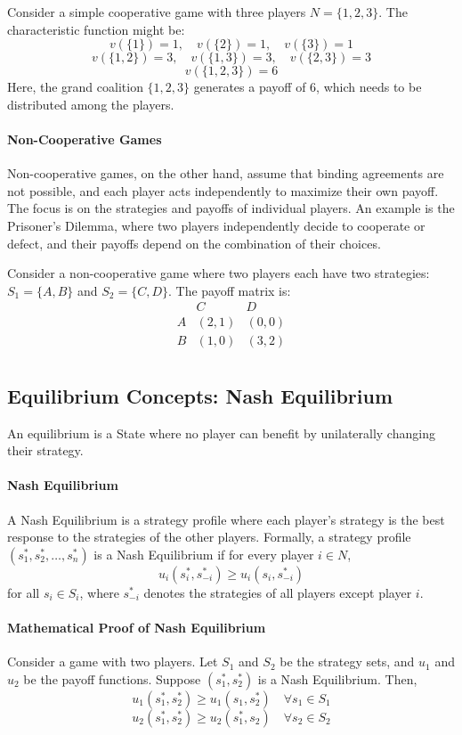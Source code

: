 \documentclass[12pt]{book} %
\begin{document}
Consider a simple cooperative game with three players \( N = \{1, 2, 3\} \). The characteristic function might be:
\[
v(\{1\}) = 1, \quad v(\{2\}) = 1, \quad v(\{3\}) = 1
\]
\[
v(\{1, 2\}) = 3, \quad v(\{1, 3\}) = 3, \quad v(\{2, 3\}) = 3
\]
\[
v(\{1, 2, 3\}) = 6
\]
Here, the grand coalition \( \{1, 2, 3\} \) generates a payoff of 6, which needs to be distributed among the players.

\paragraph{Non-Cooperative Games}
Non-cooperative games, on the other hand, assume that binding agreements are not possible, and each player acts independently to maximize their own payoff. The focus is on the strategies and payoffs of individual players. An example is the Prisoner's Dilemma, where two players independently decide to cooperate or defect, and their payoffs depend on the combination of their choices.

Consider a non-cooperative game where two players each have two strategies: \( S_1 = \{A, B\} \) and \( S_2 = \{C, D\} \). The payoff matrix is:
\[
\begin{array}{c|c|c}
 & C & D \\
\hline
A & (2, 1) & (0, 0) \\
\hline
B & (1, 0) & (3, 2) \\
\end{array}
\]

\subsection{Equilibrium Concepts: Nash Equilibrium}
An equilibrium is a State where no player can benefit by unilaterally changing their strategy.

\paragraph{Nash Equilibrium}
A Nash Equilibrium is a strategy profile where each player's strategy is the best response to the strategies of the other players. Formally, a strategy profile \( (s_1^*, s_2^*, \ldots, s_n^*) \) is a Nash Equilibrium if for every player \( i \in N \),
\[
u_i(s_i^*, s_{-i}^*) \geq u_i(s_i, s_{-i}^*)
\]
for all \( s_i \in S_i \), where \( s_{-i}^* \) denotes the strategies of all players except player \( i \).

\paragraph{Mathematical Proof of Nash Equilibrium}
Consider a game with two players. Let \( S_1 \) and \( S_2 \) be the strategy sets, and \( u_1 \) and \( u_2 \) be the payoff functions. Suppose \( (s_1^*, s_2^*) \) is a Nash Equilibrium. Then,
\[
u_1(s_1^*, s_2^*) \geq u_1(s_1, s_2^*) \quad \forall s_1 \in S_1
\]
\[
u_2(s_1^*, s_2^*) \geq u_2(s_1^*, s_2) \quad \forall s_2 \in S_2
\]
\end{document}
